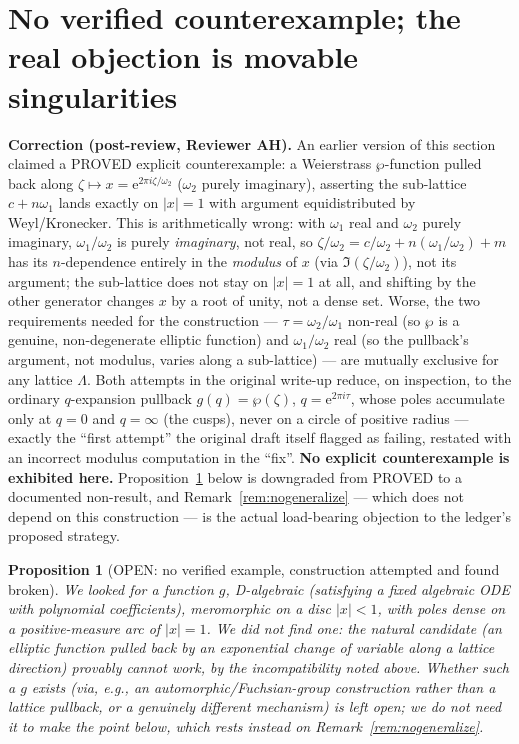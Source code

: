 \documentclass[11pt]{article}
\newtheorem{proposition}[theorem]{Proposition}
\theoremstyle{remark}
\newcommand{\e}{\mathrm e}
\begin{document}
\section{No verified counterexample; the real objection is movable singularities}\label{sec:counterexample}

\noindent\textbf{Correction (post-review, Reviewer AH).} An earlier version of this section claimed a
PROVED explicit counterexample: a Weierstrass $\wp$-function pulled back along $\zeta\mapsto
x=\e^{2\pi i\zeta/\omega_2}$ ($\omega_2$ purely imaginary), asserting the sub-lattice $c+n\omega_1$
lands exactly on $|x|=1$ with argument equidistributed by Weyl/Kronecker. This is arithmetically
wrong: with $\omega_1$ real and $\omega_2$ purely imaginary, $\omega_1/\omega_2$ is purely
\emph{imaginary}, not real, so $\zeta/\omega_2=c/\omega_2+n(\omega_1/\omega_2)+m$ has its $n$-dependence
entirely in the \emph{modulus} of $x$ (via $\Im(\zeta/\omega_2)$), not its argument; the sub-lattice
does not stay on $|x|=1$ at all, and shifting by the other generator changes $x$ by a root of unity,
not a dense set. Worse, the two requirements needed for the construction --- $\tau=\omega_2/\omega_1$
non-real (so $\wp$ is a genuine, non-degenerate elliptic function) and $\omega_1/\omega_2$ real (so the
pullback's argument, not modulus, varies along a sub-lattice) --- are mutually exclusive for any
lattice $\Lambda$. Both attempts in the original write-up reduce, on inspection, to the ordinary
$q$-expansion pullback $g(q)=\wp(\zeta)$, $q=\e^{2\pi i\tau}$, whose poles accumulate only at $q=0$ and
$q=\infty$ (the cusps), never on a circle of positive radius --- exactly the ``first attempt'' the
original draft itself flagged as failing, restated with an incorrect modulus computation in the
``fix''. \textbf{No explicit counterexample is exhibited here.} Proposition~\ref{prop:counterexample}
below is downgraded from PROVED to a documented non-result, and Remark~\ref{rem:nogeneralize} --- which
does not depend on this construction --- is the actual load-bearing objection to the ledger's proposed
strategy.

\begin{proposition}[OPEN: no verified example, construction attempted and found broken]\label{prop:counterexample}
We looked for a function $g$, D-algebraic (satisfying a fixed algebraic ODE with polynomial
coefficients), meromorphic on a disc $|x|<1$, with poles dense on a positive-measure arc of $|x|=1$.
We did not find one: the natural candidate (an elliptic function pulled back by an exponential change
of variable along a lattice direction) provably cannot work, by the incompatibility noted above.
Whether such a $g$ exists (via, e.g., an automorphic/Fuchsian-group construction rather than a lattice
pullback, or a genuinely different mechanism) is left open; we do not need it to make the point below,
which rests instead on Remark~\ref{rem:nogeneralize}.
\end{proposition}
\end{document}
